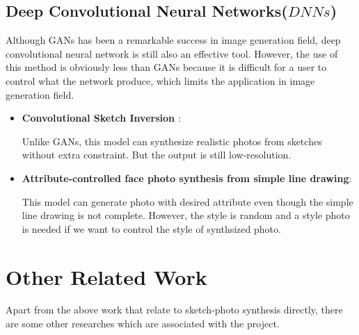 \documentclass{article}
\begin{document}
\subsection{Deep Convolutional Neural Networks($DNNs$)}
\indent Although GANs has been a remarkable success in image generation field, deep convolutional neural network is still also an effective tool. However, the use of this method is obviously less than GANs because it is difficult for a user to control what the network produce, which limits the application in image generation field.



\begin{itemize}
\item \textbf{Convolutional Sketch Inversion \cite{G2016Convolutional}}: \par
Unlike GANs, this model can synthesize realistic photos from sketches without extra constraint. But the output is still low-resolution.

\item \textbf{Attribute-controlled face photo synthesis from simple line drawing\cite{Guo2017Attribute}}:\par
This model can generate photo with desired attribute even  though
the simple line drawing is not complete. However, the style is random and a style photo is needed if we want to control the style of synthsized photo.


\end{itemize}


\section{Other Related Work}
\indent Apart from the above work that relate to sketch-photo synthesis directly, there are some other researches which are associated with the project.
\end{document}
